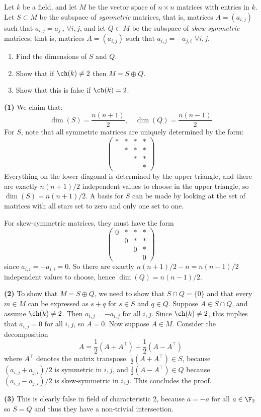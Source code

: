 \begin{problem}
  Let $k$ be a field, and let $M$ be the vector space of $n \times n$ matrices with entries in $k$. Let $S \subset M$ be the subspace of \emph{symmetric} matrices, that is, matrices $A = (a_{i,j})$ such that $a_{i,j} = a_{j,i} \; \forall i, j$, and let $Q \subset M$ be the subspace of \emph{skew-symmetric} matrices, that is, matrices $A = (a_{i,j})$ such that $a_{i,j} = -a_{j,i}$ $\forall i, j$.
  \begin{enumerate}
    \item Find the dimensions of $S$ and $Q$.
    \item Show that if $\ch(k)\neq 2$ then $M=S\oplus Q$.
    \item Show that this is false if $\ch(k)=2$.
  \end{enumerate}
\end{problem}

\textbf{(1)} We claim that:
\[ \dim(S) = \frac{n(n+1)}{2},\quad \dim(Q) = \frac{n(n-1)}{2}\]
For $S$, note that all symmetric matrices are uniquely determined by the form:
\[\begin{pmatrix}
* & * & * & *\\
  & * & * & *\\
  &   & * & *\\
  &   &   & *
\end{pmatrix}\]
Everything on the lower diagonal is determined by the upper triangle, and there are exactly $n(n+1) /2$ independent values to choose in the upper triangle, so $\dim (S)=n(n+1) /2$. A basis for $S$ can be made by looking at the set of matrices with all stars set to zero and only one set to one. 

For skew-symmetric matrices, they must have the form 
\[\begin{pmatrix}
  0 & * & * & *\\
    & 0 & * & *\\
    &   & 0 & *\\
    &   &   & 0
  \end{pmatrix}\]
since $a_{i,i}=-a_{i,i}=0$. So there are exactly $n(n+1) /2-n=n(n-1) /2$ independent values to choose, hence $\dim (Q)=n(n-1) /2$. 

\textbf{(2)} To show that $M=S\oplus Q$, we need to show that $S\cap Q=\{0\}$ and that every $m\in M$ can be expressed as $s+q$ for $s\in S$ and $q\in Q$. Suppose $A\in S\cap Q$, and assume $\ch(k) \neq 2$. Then $a_{i,j}=-a_{i,j}$ for all $i,j$. Since $\ch(k)\neq 2$, this implies that $a_{i,j}=0$ for all $i,j$, so $A=0$. Now suppose $A\in M$. Consider the decomposition
\[
  A=\frac{1}{2}(A+A^\intercal) + \frac{1}{2}(A-A^\intercal)
\]
where $A^\intercal$ denotes the matrix transpose. $\frac{1}{2}(A+A^\intercal)\in S$, because $(a_{i,j}+a_{j,i}) /2$ is symmetric in $i,j$, and $\frac{1}{2}(A-A^\intercal)\in Q$ because $(a_{i,j}-a_{j,i}) /2$ is skew-symmetric in $i,j$. This concludes the proof.       

\textbf{(3)} This is clearly false in field of characteristic $2$, because $a=-a$ for all $a\in \F_2$ so $S=Q$ and thus they have a non-trivial intersection.